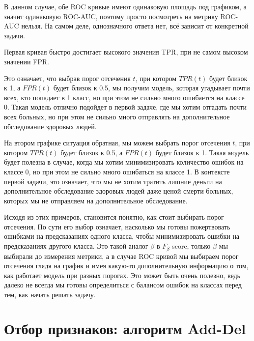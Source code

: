 \begin{solution}
В данном случае, обе ROC кривые имеют одинаковую площадь под графиком, а значит одинаковую ROC-AUC, поэтому просто посмотреть на метрику ROC-AUC нельзя.
На самом деле, однозначного ответа нет, всё зависит от конкретной задачи.

Первая кривая быстро достигает высокого значения TPR, при не самом высоком значении FPR.

Это означает, что выбрав порог отсечения $t$, при котором $TPR(t)$ будет близок к 1, а $FPR(t)$ будет близок к 0.5, мы получим модель,
которая угадывает почти всех, кто попадает в 1 класс, но при этом не сильно много ошибается на классе 0.
Такая модель отлично подойдет в первой задаче, где мы хотим отгадать почти всех больных, но при этом не сильно много отправлять на дополнительное обследование здоровых людей.

На втором графике ситуация обратная, мы можем выбрать порог отсечения $t$, при котором $TPR(t)$ будет близок к 0.5, а $FPR(t)$ будет близок к 1.
Такая модель будет полезна в случае, когда мы хотим минимизировать количество ошибок на классе 0, но при этом не сильно много ошибаться на классе 1.
В контексте первой задачи, это означает, что мы не хотим тратить лишние деньги на дополнительное обследование здоровых людей даже ценой смерти больных, которых мы не отправляем на дополнительное обследование.

Исходя из этих примеров, становится понятно, как стоит выбирать порог отсечения. По сути его выбор означает, насколько мы готовы пожертвовать ошибками на предсказаниях одного класса, чтобы минимизировать ошибки на предсказаниях другого класса.
Это такой аналог $\beta$ в $F_{\beta}$ score, только $\beta$ мы выбирали до измерения метрики, а в случае ROC кривой мы выбираем порог отсечения глядя на график и имея какую-то дополнительную информацию о том, как работает модель при разных порогах.
Это может быть очень полезно, ведь далеко не всегда мы готовы определиться с балансом ошибок на классах перед тем, как начать решать задачу.
\end{solution}










\section*{Отбор признаков: алгоритм Add-Del}

